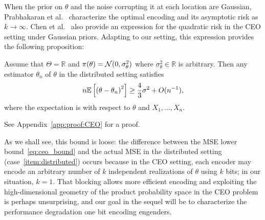 When the prior on $\theta$ and the noise corrupting it at each location are
Gaussian, Prabhakaran et al.~\cite{prabhakaran2004rate} characterize the
optimal encoding and its asymptotic risk as $k \to \infty$.  Chen et
al.~\cite{chen2004upper} also provide an expression for the quadratic risk
in the CEO setting under Gaussian priors. Adapting to our setting, this
expression provides the following proposition:
\begin{prop} \label{prop:CEO}
  Assume that $\Theta = \mathbb R$ and $\pi(\theta) =
  \mathcal{N}(0,\sigma_\theta^2)$ where $\sigma_\theta^2 \in \mathbb R$ is
  arbitrary. Then any estimator ${\theta}_n$ of $\theta$ in the distributed
  setting satisfies
  \begin{equation} \label{eq:ceo_bound}
    n \mathbb{E}\left[ \left( \theta - \theta_n \right)^2\right] \geq \frac{4}{3} \sigma^2 + O(n^{-1}),
  \end{equation}
  where the expectation is with respect to $\theta$ and $X_1,\ldots,X_n$.
\end{prop}
\noindent
See Appendix~\ref{app:proof:CEO} for a proof.

As we shall see, this bound is loose: the difference between the MSE lower
bound~\eqref{eq:ceo_bound} and the actual MSE in the distributed setting
(case~\eqref{item:distributed}) occurs because in the CEO setting, each
encoder may encode an arbitrary number of $k$ independent realizations of
$\theta$ using $k$ bits; in our situation, $k = 1$. That blocking allows
more efficient encoding and exploiting the high-dimensional geometry of the
product probability space in the CEO problem is perhaps unsurprising, and
our goal in the sequel will be to characterize the performance degradation
one bit encoding engenders.
